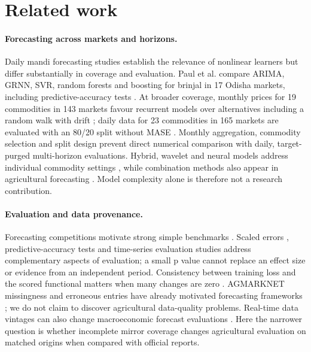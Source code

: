 \section{Related work}\label{sec:related}

\paragraph{Forecasting across markets and horizons.}
Daily mandi forecasting studies establish the relevance of nonlinear learners but differ substantially in coverage and evaluation. Paul et al. compare ARIMA, GRNN, SVR, random forests and boosting for brinjal in 17 Odisha markets, including predictive-accuracy tests \cite{paul2022brinjal}. At broader coverage, monthly prices for 19 commodities in 143 markets favour recurrent models over alternatives including a random walk with drift \cite{paul2025deep}; daily data for 23 commodities in 165 markets are evaluated with an 80/20 split without MASE \cite{manogna2025deep}. Monthly aggregation, commodity selection and split design prevent direct numerical comparison with daily, target-purged multi-horizon evaluations. Hybrid, wavelet and neural models address individual commodity settings \cite{paul2021wavelet,jha2012tdnn,jha2013ann,anjoy2017pulses,kumar2021onion,praveenkumar2024potato,jaiswal2021lstm}, while combination methods also appear in agricultural forecasting \cite{wang2022bee}. Model complexity alone is therefore not a research contribution.

\paragraph{Evaluation and data provenance.}
Forecasting competitions motivate strong simple benchmarks \cite{makridakis2018statistical,makridakis2020m4,makridakis2022m5}. Scaled errors \cite{hyndman2006another}, predictive-accuracy tests \cite{diebold1995comparing} and time-series evaluation studies \cite{bergmeir2018note,cerqueira2020evaluating,hewamalage2022pitfalls} address complementary aspects of evaluation; a small p value cannot replace an effect size or evidence from an independent period. Consistency between training loss and the scored functional matters when many changes are zero \cite{gneiting2011making,kolassa2016evaluating}.
AGMARKNET missingness and erroneous entries have already motivated forecasting frameworks \cite{jain2020agmarknet,guo2020agmarknet}; we do not claim to discover agricultural data-quality problems. Real-time data vintages can also change macroeconomic forecast evaluations \cite{bokun2023fredsd}. Here the narrower question is whether incomplete mirror coverage changes agricultural evaluation on matched origins when compared with official reports.

